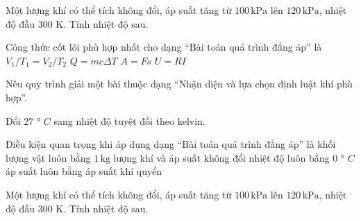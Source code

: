 \begin{ex}
Một lượng khí có thể tích không đổi, áp suất tăng từ $100\,\text{kPa}$ lên $120\,\text{kPa}$, nhiệt độ đầu 300 K. Tính nhiệt độ sau.
\end{ex}

\begin{ex}
Công thức cốt lõi phù hợp nhất cho dạng “Bài toán quá trình đẳng áp” là
\choice
{\True $V_1/T_1=V_2/T_2$}
{$Q=mc\Delta T$}
{$A=Fs$}
{$U=RI$}
\end{ex}

\begin{ex}
Nêu quy trình giải một bài thuộc dạng “Nhận diện và lựa chọn định luật khí phù hợp”.
\choiceTF

\end{ex}

\begin{ex}
Đổi 27 ° $C$ sang nhiệt độ tuyệt đối theo kelvin.
\end{ex}

\begin{ex}
Điều kiện quan trọng khi áp dụng dạng “Bài toán quá trình đẳng áp” là
\choice
{khối lượng vật luôn bằng $1\,\text{kg}$}
{\True lượng khí và áp suất không đổi}
{nhiệt độ luôn bằng 0 ° $C$}
{áp suất luôn bằng áp suất khí quyển}
\end{ex}

\begin{ex}
Một lượng khí có thể tích không đổi, áp suất tăng từ $100\,\text{kPa}$ lên $120\,\text{kPa}$, nhiệt độ đầu 300 K. Tính nhiệt độ sau.
\choiceTF

\end{ex}

